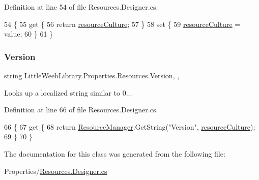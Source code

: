 Definition at line 54 of file Resources.\+Designer.\+cs.


\begin{DoxyCode}
54                                                                        \{
55             \textcolor{keyword}{get} \{
56                 \textcolor{keywordflow}{return} \mbox{\hyperlink{class_little_weeb_library_1_1_properties_1_1_resources_aeef4a113050bf5ebd1968df426863a61}{resourceCulture}};
57             \}
58             \textcolor{keyword}{set} \{
59                 \mbox{\hyperlink{class_little_weeb_library_1_1_properties_1_1_resources_aeef4a113050bf5ebd1968df426863a61}{resourceCulture}} = value;
60             \}
61         \}
\end{DoxyCode}
\mbox{\label{class_little_weeb_library_1_1_properties_1_1_resources_a8782c3cb37586a67ccab0154bd2b8d5d}} 
\subsubsection{\texorpdfstring{Version}{Version}}
{\footnotesize\ttfamily string Little\+Weeb\+Library.\+Properties.\+Resources.\+Version\hspace{0.3cm}{\ttfamily [static]}, {\ttfamily [get]}, {\ttfamily [package]}}



Looks up a localized string similar to 0... 



Definition at line 66 of file Resources.\+Designer.\+cs.


\begin{DoxyCode}
66                                        \{
67             \textcolor{keyword}{get} \{
68                 \textcolor{keywordflow}{return} \mbox{\hyperlink{class_little_weeb_library_1_1_properties_1_1_resources_a177db73ea6cb556ab6cc1b12777e1ad2}{ResourceManager}}.GetString(\textcolor{stringliteral}{"Version"}, 
      \mbox{\hyperlink{class_little_weeb_library_1_1_properties_1_1_resources_aeef4a113050bf5ebd1968df426863a61}{resourceCulture}});
69             \}
70         \}
\end{DoxyCode}


The documentation for this class was generated from the following file\+:\begin{DoxyCompactItemize}
\item 
Properties/\mbox{\hyperlink{_resources_8_designer_8cs}{Resources.\+Designer.\+cs}}\end{DoxyCompactItemize}
